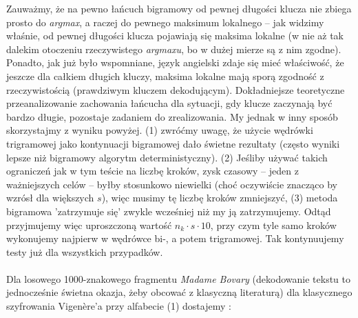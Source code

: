 \documentclass[a4paper]{article}
\theoremstyle{defn}
\theoremstyle{theorem}
\theoremstyle{lemma}
\theoremstyle{cor}
\theoremstyle{fact}
\begin{document}
Zauważmy, że na pewno łańcuch bigramowy od pewnej długości klucza nie zbiega prosto do \textit{argmax}, a raczej do pewnego maksimum lokalnego – jak widzimy właśnie, od pewnej długości klucza pojawiają się maksima lokalne (w nie aż tak dalekim otoczeniu rzeczywistego \textit{argmaxu}, bo w dużej mierze są z nim zgodne). Ponadto, jak już było wspomniane, język angielski zdaje się mieć właściwość, że jeszcze dla całkiem długich kluczy, maksima lokalne mają sporą zgodność z rzeczywistością (prawdziwym kluczem dekodującym). Dokładniejsze teoretyczne przeanalizowanie zachowania łańcucha dla sytuacji, gdy klucze zaczynają być bardzo długie, pozostaje zadaniem do zrealizowania. My jednak w inny sposób skorzystajmy z wyniku powyżej. (1) zwróćmy uwagę, że użycie wędrówki trigramowej jako kontynuacji bigramowej dało świetne rezultaty (często wyniki lepsze niż bigramowy algorytm deterministyczny). (2) Jeśliby używać takich ograniczeń jak w tym teście na liczbę kroków, zysk czasowy – jeden z ważniejszych celów – byłby stosunkowo niewielki (choć oczywiście znacząco by wzrósł dla większych $s$), więc musimy tę liczbę kroków zmniejszyć, (3) metoda bigramowa 'zatrzymuje się' zwykle wcześniej niż my ją zatrzymujemy. Odtąd przyjmujemy więc uproszczoną wartość $n_k \cdot s \cdot 10$, przy czym tyle samo kroków wykonujemy najpierw w wędrówce bi-, a potem trigramowej. Tak kontynuujemy testy już dla wszystkich przypadków.\\\\
Dla losowego 1000-znakowego fragmentu \textit{Madame Bovary} (dekodowanie tekstu to jednocześnie świetna okazja, żeby obcować z klasyczną literaturą) dla klasycznego szyfrowania Vigenère'a przy alfabecie (1) dostajemy :\\
\end{document}
